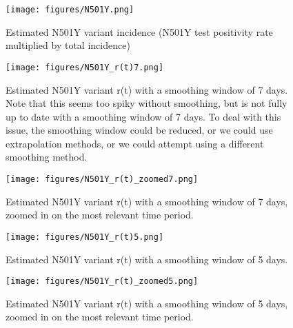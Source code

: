 \documentclass{article}
\begin{document}
\clearpage
\begin{figure}[h!]
    \centering
    \texttt{[image: figures/N501Y.png]}
    \caption{Estimated N501Y variant incidence (N501Y test positivity rate multiplied by total incidence)}
\end{figure}

\clearpage
\begin{figure}[h!]
    \centering
    \texttt{[image: figures/N501Y\_r(t)7.png]}
    \caption{Estimated N501Y variant r(t) with a smoothing window of 7 days. Note that this seems too spiky without smoothing, but is not fully up to date with a smoothing window of 7 days. To deal with this issue, the smoothing window could be reduced, or we could use extrapolation methods, or we could attempt using a different smoothing method.}

\end{figure}

\begin{figure}[h!]
    \centering
    \texttt{[image: figures/N501Y\_r(t)\_zoomed7.png]}
    \caption{Estimated N501Y variant r(t) with a smoothing window of 7 days, zoomed in on the most relevant time period.}
\end{figure}

\clearpage
\begin{figure}[h!]
    \centering
    \texttt{[image: figures/N501Y\_r(t)5.png]}
    \caption{Estimated N501Y variant r(t) with a smoothing window of 5 days.}

\end{figure}

\begin{figure}[h!]
    \centering
    \texttt{[image: figures/N501Y\_r(t)\_zoomed5.png]}
    \caption{Estimated N501Y variant r(t) with a smoothing window of 5 days, zoomed in on the most relevant time period.}
\end{figure}
\end{document}
